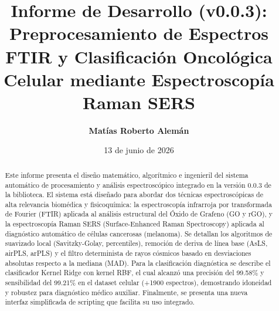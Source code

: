 \documentclass[a4paper,11pt]{article}
\title{\textbf{Informe de Desarrollo (v0.0.3): \\Preprocesamiento de Espectros FTIR y Clasificación Oncológica Celular mediante Espectroscopía Raman SERS}}
\author{\textbf{Matías Roberto Alemán}}
\date{13 de junio de 2026}
\begin{document}
\maketitle

\begin{abstract}
Este informe presenta el diseño matemático, algorítmico e ingenieril del sistema automático de procesamiento y análisis espectroscópico integrado en la versión 0.0.3 de la biblioteca. El sistema está diseñado para abordar dos técnicas espectroscópicas de alta relevancia biomédica y fisicoquímica: la espectroscopía infrarroja por transformada de Fourier (FTIR) aplicada al análisis estructural del Óxido de Grafeno (GO y rGO), y la espectroscopía Raman SERS (Surface-Enhanced Raman Spectroscopy) aplicada al diagnóstico automático de células cancerosas (melanoma). Se detallan los algoritmos de suavizado local (Savitzky-Golay, percentiles), remoción de deriva de línea base (AsLS, airPLS, arPLS) y el filtro determinista de rayos cósmicos basado en desviaciones absolutas respecto a la mediana (MAD). Para la clasificación diagnóstica se describe el clasificador Kernel Ridge con kernel RBF, el cual alcanzó una precisión del 99.58\% y sensibilidad del 99.21\% en el dataset celular (+1900 espectros), demostrando idoneidad y robustez para diagnóstico médico auxiliar. Finalmente, se presenta una nueva interfaz simplificada de scripting que facilita su uso integrado.
\end{abstract}

\vspace{0.2cm}
\noindent\hrulefill
\vspace{0.2cm}
\end{document}

